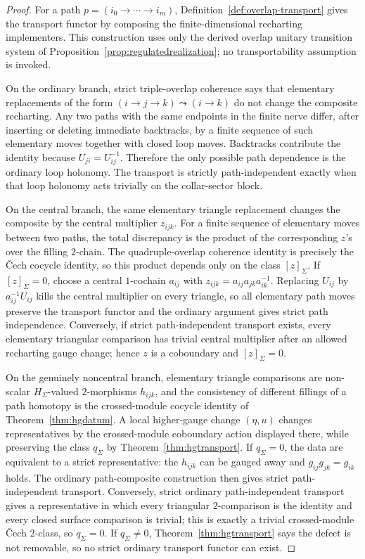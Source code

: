 \documentclass[11pt]{article}
\begin{document}
\begin{proof}
For a path \(p=(i_0\to\cdots\to i_m)\), Definition~\ref{def:overlap-transport} gives the
transport functor by composing the finite-dimensional recharting implementers. This construction
uses only the derived overlap unitary transition system of
Proposition~\ref{prop:regulatedrealization}; no transportability assumption is invoked.

On the ordinary branch, strict triple-overlap coherence says that elementary replacements of the
form \((i\to j\to k)\leadsto(i\to k)\) do not change the composite recharting. Any two paths with
the same endpoints in the finite nerve differ, after inserting or deleting immediate backtracks,
by a finite sequence of such elementary moves together with closed loop moves. Backtracks
contribute the identity because \(U_{ji}=U_{ij}^{-1}\). Therefore the only possible path
dependence is the ordinary loop holonomy. The transport is strictly path-independent exactly when
that loop holonomy acts trivially on the collar-sector block.

On the central branch, the same elementary triangle replacement changes the composite by the
central multiplier \(z_{ijk}\). For a finite sequence of elementary moves between two paths, the
total discrepancy is the product of the corresponding \(z\)'s over the filling \(2\)-chain. The
quadruple-overlap coherence identity is precisely the \v{C}ech cocycle identity, so this product
depends only on the class \([z]_\Sigma\). If \([z]_\Sigma=0\), choose a central \(1\)-cochain
\(a_{ij}\) with \(z_{ijk}=a_{ij}a_{jk}a_{ik}^{-1}\). Replacing \(U_{ij}\) by \(a_{ij}^{-1}U_{ij}\)
kills the central multiplier on every triangle, so all elementary path moves preserve the
transport functor and the ordinary argument gives strict path independence. Conversely, if strict
path-independent transport exists, every elementary triangular comparison has trivial central
multiplier after an allowed recharting gauge change; hence \(z\) is a coboundary and
\([z]_\Sigma=0\).

On the genuinely noncentral branch, elementary triangle comparisons are non-scalar
\(H_\Sigma\)-valued \(2\)-morphisms \(h_{ijk}\), and the consistency of different fillings of a
path homotopy is the crossed-module cocycle identity of Theorem~\ref{thm:hgdatum}. A local
higher-gauge change \((\eta,u)\) changes representatives by the crossed-module coboundary action
displayed there, while preserving the class \(q_\Sigma\) by Theorem~\ref{thm:hgtransport}. If
\(q_\Sigma=0\), the data are equivalent to a strict representative: the \(h_{ijk}\) can be gauged
away and \(g_{ij}g_{jk}=g_{ik}\) holds. The ordinary path-composite construction then gives
strict path-independent transport. Conversely, strict ordinary path-independent transport gives a
representative in which every triangular \(2\)-comparison is the identity and every closed surface
comparison is trivial; this is exactly a trivial crossed-module \v{C}ech \(2\)-class, so
\(q_\Sigma=0\). If \(q_\Sigma\ne0\), Theorem~\ref{thm:hgtransport} says the defect is not
removable, so no strict ordinary transport functor can exist.
\end{proof}
\end{document}
